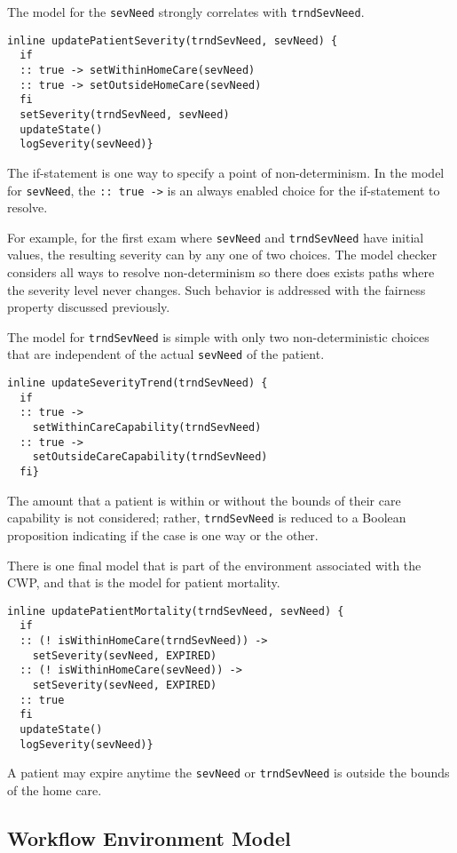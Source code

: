 The model for the \texttt{sevNeed} strongly correlates with \texttt{trndSevNeed}.
%
{\small
\begin{lstlisting}[style=myPromela]
inline updatePatientSeverity(trndSevNeed, sevNeed) {
  if
  :: true -> setWithinHomeCare(sevNeed)
  :: true -> setOutsideHomeCare(sevNeed)
  fi 
  setSeverity(trndSevNeed, sevNeed)
  updateState()
  logSeverity(sevNeed)}
\end{lstlisting}
}
%
\noindent The if-statement is one way to specify a point of non-determinism.
In the model for \texttt{sevNeed}, the \texttt{:: true ->} is an always enabled choice for the if-statement to resolve. 

For example, for the first exam where \texttt{sevNeed} and \texttt{trndSevNeed} have initial values, the resulting severity can by any one of two choices.
The model checker considers all ways to resolve non-determinism so there does exists paths where the severity level never changes.
Such behavior is addressed with the fairness property discussed previously.

The model for \texttt{trndSevNeed} is simple with only two non-deterministic choices that are independent of the actual \texttt{sevNeed} of the patient. 
%
{\small
\begin{lstlisting}[style=myPromela]
inline updateSeverityTrend(trndSevNeed) {
  if
  :: true -> 
    setWithinCareCapability(trndSevNeed)
  :: true -> 
    setOutsideCareCapability(trndSevNeed)
  fi}
\end{lstlisting}
}
%
\noindent The amount that a patient is within or without the bounds of their care capability is not considered;
rather, \texttt{trndSevNeed} is reduced to a Boolean proposition indicating if the case is one way or the other.

There is one final model that is part of the environment associated with the CWP, and that is the model for patient mortality. 
%
{\small
\begin{lstlisting}[style=myPromela]
inline updatePatientMortality(trndSevNeed, sevNeed) {
  if
  :: (! isWithinHomeCare(trndSevNeed)) -> 
    setSeverity(sevNeed, EXPIRED)
  :: (! isWithinHomeCare(sevNeed)) ->
    setSeverity(sevNeed, EXPIRED)
  :: true
  fi
  updateState()
  logSeverity(sevNeed)}
\end{lstlisting}
}
%
\noindent A patient may expire anytime the \texttt{sevNeed} or \texttt{trndSevNeed} is outside the bounds of the home care.

\subsection{Workflow Environment Model}

